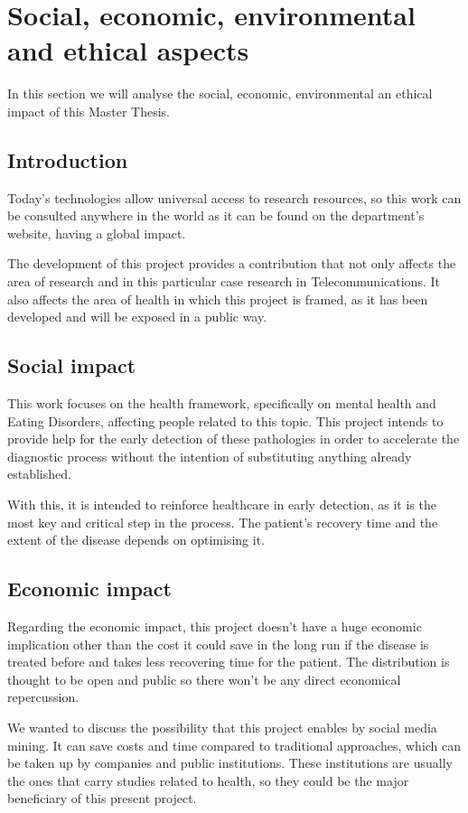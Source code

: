 \chapter{Social, economic, environmental and ethical aspects}

In this section we will analyse the social, economic, environmental an ethical impact of this Master Thesis.

\section{Introduction}
Today's technologies allow universal access to research resources, so this work can be consulted anywhere in the world as it can be found on the department's website, having a global impact.

The development of this project provides a contribution that not only affects the area of research and in this particular case research in Telecommunications. It also affects the area of health in which this project is framed, as it has been developed and will be exposed in a public way.


\section*{Social impact}
This work focuses on the health framework, specifically on mental health and Eating Disorders, affecting people related to this topic. This project intends to provide help for the early detection of these pathologies in order to accelerate the diagnostic process without the intention of substituting anything already established.

With this, it is intended to reinforce healthcare in early detection, as it is the most key and critical step in the process. The patient's recovery time and the extent of the disease depends on optimising it.

\section{Economic impact}
Regarding the economic impact, this project doesn't have a huge economic implication other than the cost it could save in the long run if the disease is treated before and takes less recovering time for the patient. The distribution is thought to be open and public so there won't be any direct economical repercussion.

We wanted to discuss the possibility that this project enables by social media mining. It can save costs and time compared to traditional approaches, which can be taken up by companies and public institutions. These institutions are usually the ones that carry studies related to health, so they could be the major beneficiary of this present project.

